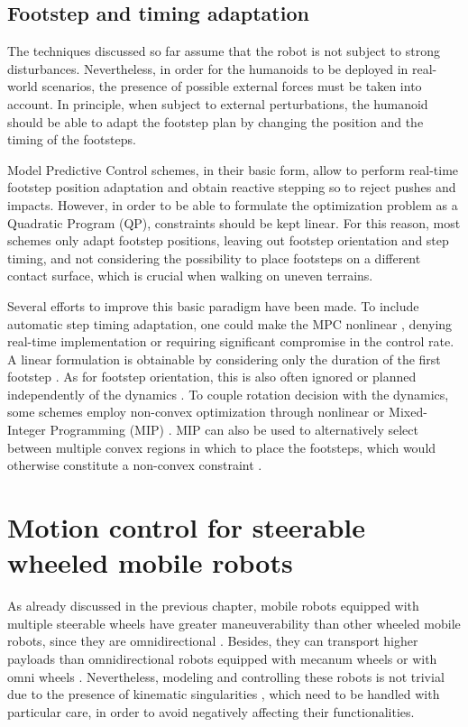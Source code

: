 \subsection{Footstep and timing adaptation}
The techniques discussed so far assume that the robot is not subject to strong 
disturbances. Nevertheless, in order for the humanoids to be deployed in
real-world scenarios, the presence of possible external forces must be taken 
into account. In principle, when subject
to external perturbations, the humanoid should be able to adapt the footstep plan
by changing the position and the timing of the footsteps.

Model Predictive Control schemes, in their basic form, allow to
perform real-time footstep position adaptation \cite{Herdt2010IROS} and obtain
reactive stepping so to reject pushes and impacts. However, in order to be
able to formulate the optimization problem as a Quadratic Program (QP),
constraints should be kept linear. For this reason, most schemes only adapt
footstep positions, leaving out footstep orientation and step timing, and not
considering the possibility to place footsteps on a different contact surface,
which is crucial when walking on uneven terrains.

Several efforts to improve this basic paradigm have been made. To include
automatic step timing adaptation, one could make the MPC nonlinear
\cite{Maximo2020MIQPAutomaticWalking,Bohorquez2017AdaptiveStepDuration,
Caron2017Whentomakeastep,Aurelien2014IROS}, denying real-time implementation or
requiring significant compromise in the control rate. A linear formulation is
obtainable by considering only the duration of the first footstep
\cite{Smaldone2021FeasibilityDrivenSTA,Khadiv2020StepTimingAdaptation}.
As for footstep orientation, this is also often ignored or planned independently
of the dynamics \cite{Herdt2010IROS}. To couple rotation decision with the
dynamics, some schemes employ non-convex optimization through nonlinear
\cite{Naveau2017RAL,Bohorquez2018AdaptiveStepRotation} or Mixed-Integer
Programming (MIP) \cite{Maximo2020MIQPAutomaticWalking}.
MIP can also be used to alternatively select between multiple convex regions
in which to place the footsteps, which would otherwise constitute a
non-convex constraint \cite{Aceituno2018RAL,Deits2014FootstepPlanningMIQCQP}.

\section{Motion control for steerable wheeled mobile robots}
As already discussed in the previous chapter, mobile robots equipped with
multiple steerable wheels
have greater maneuverability than other wheeled mobile robots, since they are
omnidirectional \cite{RobuffoGiordano2009ICRA}. Besides, they can transport
higher payloads than omnidirectional robots equipped with mecanum wheels
\cite{Dickerson1991ControlOminidirectionalRobotwithMecaumWheels} or
with omni wheels \cite{Blumrich1974OmnidirectionalWheel}.
Nevertheless, modeling and controlling these robots is not
trivial due to the presence of kinematic singularities \cite{Sorour2017RAL},
which need to be handled with particular care, in order to avoid negatively
affecting their functionalities.

